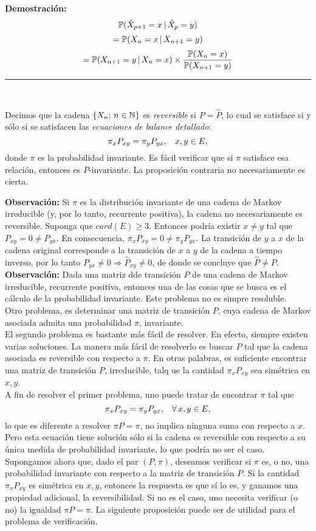 \textbf{Demostración: }
\[\mathbb{P}(\hat{X}_{p+1} = x\,|\,\hat{X}_p = y)\]
\[= \mathbb{P}(X_n =x\,|\,X_{n+1}=y)\]
\[= \mathbb{P}(X_{n+1} = y\,|\,X_n=x)\times \frac{\mathbb{P}(X_n=x)}{\mathbb{P}(X_{n+1}=y)}\]
\rule{0.7em}{0.7em}\\ \newline

Decimos que la cadena $\{X_n;\,n\in\mathbb N\}$ es \textit{reversible} si $P=\hat{P}$, lo cual se satisface si y sólo si se satisfacen las \textit{ecuaciones de balance detallado}:
\[\pi_x P_{xy} = \pi_y P_{yx},\hspace{0.3cm}x,y\in E,\]
donde $\pi$ es la probabilidad invariante. Es fácil verificar que si $\pi$ satisface esa relación, entonces es $P$-invariante. La proposición contraria no necesariamente es cierta.\\ \newline
 
\textbf{Observación: }Si $\pi$ es la distribución invariante de una cadena de Markov irreducible (y, por lo tanto, recurrente positiva), la cadena no necesariamente es reversible. Suponga que $card(E)\geq 3$. Entonces podría existir $x\neq y$ tal que $P_{xy}=0\neq P_{yx}$. En consecuencia, $\pi_xP_{xy}=0\neq \pi_yP_{yx}$. La transición de $y$ a $x$ de la cadena original corresponde a la transición de $x$ a $y$ de la cadena a tiempo inverso, por lo tanto $P_{yx}\neq 0 \Longrightarrow \hat{P}_{xy} \neq 0$, de donde se concluye que $\hat{P}\neq P$.\\

\textbf{Observación: }Dada una matriz dde transición $P$ de una cadena de Markov irreducible, recurrente positiva, entonces una de las cosas que se busca es el cálculo de la probabilidad invariante. Este problema no es simpre resoluble.\\ 
Otro problema, es determinar una matriz de transición $P$, cuya cadena de Markov asociada admita una probabilidad $\pi$, invariante.\\ 
El segundo problema es bastante más fácil de resolver. En efecto, siempre existen varias soluciones. La manera más fácil de resolverlo es buscar $P$ tal que la cadena asociada es reversible con respecto a $\pi$. En otras palabras, es suficiente encontrar una matriz de transición $P$, irreducible, talq ue la cantidad $\pi_x P_{xy}$ sea simétrica en $x,y$.\\
A fin de resolver el primer problema, uno puede tratar de encontrar $\pi$ tal que
\[\pi_x P_{xy} = \pi_y P_{yx},\hspace{0.3cm}\forall\,x,y\in E,\]
lo que es diferente a resolver $\pi P= \pi$, no implica ninguna suma con respecto a $x$. Pero esta ecuación tiene solución sólo si la cadena es reversible con respecto a su única medida de probabilidad invariante, lo que podría no ser el caso.\\
Supongamos ahora que, dado el par $(P,\pi)$, deseamos verificar si $\pi$ es, o no, una probabilidad invariante con respecto a la matriz de transición $P$. Si la cantidad $\pi_x P_{xy}$ es simétrica en $x,y$, entonces la respuesta es que sí lo es, y ganamos una propiedad adicional, la reversibilidad. Si no es el caso, uno necesita verificar (o no) la igualdad $\pi P = \pi$. La siguiente proposición puede ser de utilidad para el problema de verificación.

